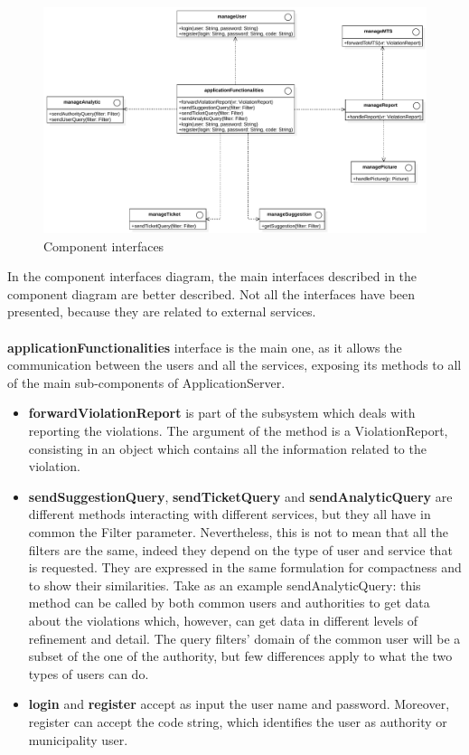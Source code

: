 \documentclass[./main.tex]{subfiles}
\begin{document}
\begin{figure}[H]
\centering
\includegraphics[width=\textwidth]{resources/interfaces_diagram}
\caption{Component interfaces}
\label{fig:interfaces}
\end{figure}

In the component interfaces diagram, the main interfaces described in the component diagram are better described. Not all the interfaces have been presented, because they are related to external services.\\\\
\textbf{applicationFunctionalities} interface is the main one, as it allows the communication between the users and all the services, exposing its methods to all of the main sub-components of ApplicationServer.
 
\begin{itemize}
\item
	\textbf{forwardViolationReport} is part of the subsystem which deals with reporting the violations. The argument of the method is a ViolationReport, consisting in an object which contains all the information related to the violation.
	
\item
	\textbf{sendSuggestionQuery}, \textbf{sendTicketQuery} and \textbf{sendAnalyticQuery} are different methods interacting with different services, but they all have in common the Filter parameter. Nevertheless, this is not to mean that all the filters are the same, indeed they depend on the type of user and service that is requested. They are expressed in the same formulation for compactness and to show their similarities. Take as an example sendAnalyticQuery: this method can be called by both common users and authorities to get data about the violations which, however, can get data in different levels of refinement and detail. The query filters' domain of the common user will be a subset of the one of the authority, but few differences apply to what the two types of users can do.
	
\item
	\textbf{login} and \textbf{register} accept as input the user name and password. Moreover, register can accept the code string, which identifies the user as authority or municipality user.
	
\end{itemize}
\end{document}
